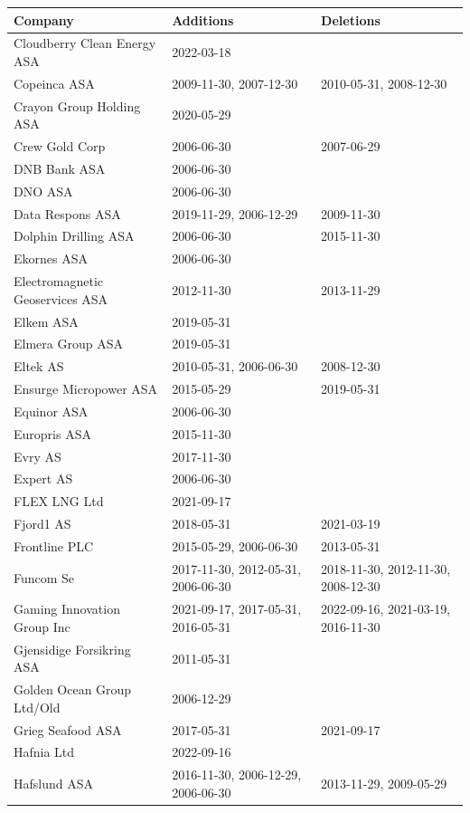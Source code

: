\begin{table}[H]
\centering
\begin{tabularx}{\textwidth}{XXX}
\toprule
Company & Additions & Deletions \\ 
\midrule
Cloudberry Clean Energy ASA & 2022-03-18 &  \\ 
Copeinca ASA & 2009-11-30, 2007-12-30 & 2010-05-31, 2008-12-30 \\ 
Crayon Group Holding ASA & 2020-05-29 &  \\ 
Crew Gold Corp & 2006-06-30 & 2007-06-29 \\ 
DNB Bank ASA & 2006-06-30 &  \\ 
DNO ASA & 2006-06-30 &  \\ 
Data Respons ASA & 2019-11-29, 2006-12-29 & 2009-11-30 \\ 
Dolphin Drilling ASA & 2006-06-30 & 2015-11-30 \\ 
Ekornes ASA & 2006-06-30 &  \\ 
Electromagnetic Geoservices ASA & 2012-11-30 & 2013-11-29 \\ 
Elkem ASA & 2019-05-31 &  \\ 
Elmera Group ASA & 2019-05-31 &  \\ 
Eltek AS & 2010-05-31, 2006-06-30 & 2008-12-30 \\ 
Ensurge Micropower ASA & 2015-05-29 & 2019-05-31 \\ 
Equinor ASA & 2006-06-30 &  \\ 
Europris ASA & 2015-11-30 &  \\ 
Evry AS & 2017-11-30 &  \\ 
Expert AS & 2006-06-30 &  \\ 
FLEX LNG Ltd & 2021-09-17 &  \\ 
Fjord1 AS & 2018-05-31 & 2021-03-19 \\ 
Frontline PLC & 2015-05-29, 2006-06-30 & 2013-05-31 \\ 
Funcom Se & 2017-11-30, 2012-05-31, 2006-06-30 & 2018-11-30, 2012-11-30, 2008-12-30 \\ 
Gaming Innovation Group Inc & 2021-09-17, 2017-05-31, 2016-05-31 & 2022-09-16, 2021-03-19, 2016-11-30 \\ 
Gjensidige Forsikring ASA & 2011-05-31 &  \\ 
Golden Ocean Group Ltd/Old & 2006-12-29 &  \\ 
Grieg Seafood ASA & 2017-05-31 & 2021-09-17 \\ 
Hafnia Ltd & 2022-09-16 &  \\ 
Hafslund ASA & 2016-11-30, 2006-12-29, 2006-06-30 & 2013-11-29, 2009-05-29 \\ 

\end{tabularx}
\end{table}
